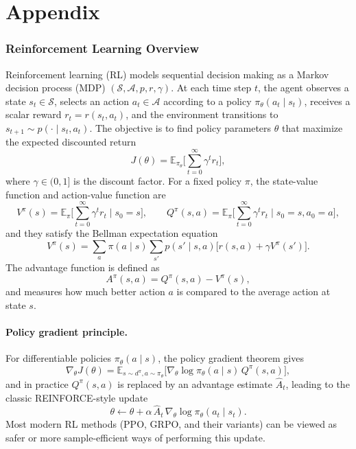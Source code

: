 \appendix
\section{Appendix}
\subsubsection{Reinforcement Learning Overview}
Reinforcement learning (RL) models sequential decision making as a Markov decision process (MDP) $(\mathcal{S}, \mathcal{A}, p, r, \gamma)$. At each time step $t$, the agent observes a state $s_t \in \mathcal{S}$, selects an action $a_t \in \mathcal{A}$ according to a policy $\pi_\theta(a_t \mid s_t)$, receives a scalar reward $r_t = r(s_t, a_t)$, and the environment transitions to $s_{t+1} \sim p(\cdot \mid s_t, a_t)$. The objective is to find policy parameters $\theta$ that maximize the expected discounted return
\[
J(\theta) = \mathbb{E}_{\pi_\theta} \Bigg[ \sum_{t=0}^{\infty} \gamma^t r_t \Bigg],
\]
where $\gamma \in (0,1]$ is the discount factor. For a fixed policy $\pi$, the state-value function and action-value function are
\[
V^\pi(s) = \mathbb{E}_\pi \big[ \sum_{t=0}^{\infty} \gamma^t r_t \mid s_0 = s \big], 
\qquad
Q^\pi(s,a) = \mathbb{E}_\pi \big[ \sum_{t=0}^{\infty} \gamma^t r_t \mid s_0 = s, a_0 = a \big],
\]
and they satisfy the Bellman expectation equation
\[
V^\pi(s) = \sum_{a} \pi(a \mid s) \sum_{s'} p(s' \mid s, a) \big[ r(s,a) + \gamma V^\pi(s') \big].
\]
The advantage function is defined as
\[
A^\pi(s,a) = Q^\pi(s,a) - V^\pi(s),
\]
and measures how much better action $a$ is compared to the average action at state $s$.

\paragraph{Policy gradient principle.}
For differentiable policies $\pi_\theta(a \mid s)$, the policy gradient theorem gives
\[
\nabla_\theta J(\theta) = \mathbb{E}_{s \sim d^\pi, a \sim \pi_\theta} \big[ \nabla_\theta \log \pi_\theta(a \mid s) \, Q^\pi(s,a) \big],
\]
and in practice $Q^\pi(s,a)$ is replaced by an advantage estimate $\hat A_t$, leading to the classic REINFORCE-style update
\[
\theta \leftarrow \theta + \alpha \, \hat A_t \, \nabla_\theta \log \pi_\theta(a_t \mid s_t).
\]
Most modern RL methods (PPO, GRPO, and their variants) can be viewed as safer or more sample-efficient ways of performing this update.

